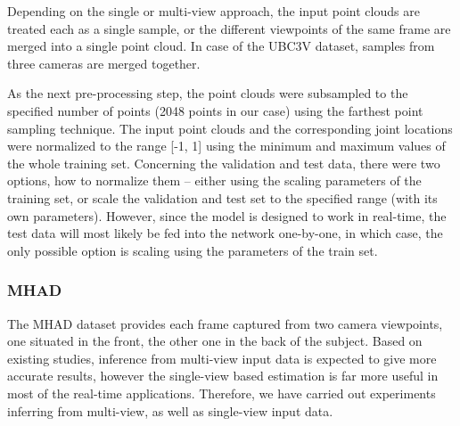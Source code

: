 Depending on the single or multi-view approach, the input point clouds are treated each as a single sample, or the different viewpoints of the same frame are merged into a single point cloud. In case of the UBC3V dataset, samples from three cameras are merged together. %
\par
\vspace{5mm}
\noindent
As the next pre-processing step, the point clouds were subsampled to the specified number of points (2048 points in our case) using the farthest point sampling technique. The input point clouds and the corresponding joint locations were normalized to the range [-1, 1] using the minimum and maximum values of the whole training set. Concerning the validation and test data, there were two options, how to normalize them – either using the scaling parameters of the training set, or scale the validation and test set to the specified range (with its own parameters). However, since the model is designed to work in real-time, the test data will most likely be fed into the network one-by-one, in which case, the only possible option is scaling using the parameters of the train set.\par

\subsubsection{MHAD}
The MHAD dataset provides each frame captured from two camera viewpoints, one situated in the front, the other one in the back of the subject.
Based on existing studies, inference from multi-view input data is expected to give more accurate results, however the single-view based estimation is far more useful in most of the real-time applications. Therefore, we have carried out experiments inferring from multi-view, as well as single-view input data.\par
\vspace{5mm}

